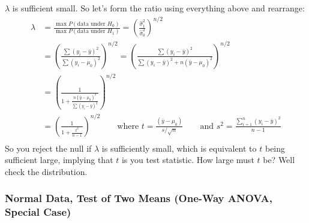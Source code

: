 \documentclass[a4paper,12pt]{scrartcl}
\begin{document}
$\lambda$ is sufficient small. So let's form the ratio using 
everything above and rearrange:
\begin{align*}
   \lambda &= \frac{\max P(\text{data under $H_0$})}{
      \max P(\text{data under $H_1$})} = \left(
      \frac{\hat{\sigma}_1^2}{\hat{\sigma}_0^2}\right)^{n/2}\\
   &= \left( \frac{\sum (y_i - \bar{y})^2}{\sum (y_i - \mu_0)^2}
      \right)^{n/2}
   = \left( \frac{\sum (y_i - \bar{y})^2}{\sum (y_i - \bar{y})^2 +
   n(\bar{y} - \mu_0)^2}
      \right)^{n/2}\\
   &= \left( \frac{1}{1 + \frac{n(\bar{y} - \mu_0)^2}{
      \sum (y_i - \bar{y})^2 }}
      \right)^{n/2}\\
   &= \left( \frac{1}{1 + \frac{t^2}{n-1}}
   \right)^{n/2} \qquad \text{where } 
   t = \frac{(\bar{y}-\mu_0)}{s/\sqrt{n}}\qquad 
   \text{and } s^2 = \frac{\sum^n_{i=1} (y_i - \bar{y})^2}{n-1} \\
\end{align*}
So you reject the null if $\lambda$ is sufficiently small, which
is equivalent to $t$ being sufficient large, implying that $t$ is you
test statistic. How large must $t$ be? Well check the distribution.

\newpage
\subsubsection{Normal Data, Test of Two Means (One-Way ANOVA, Special
   Case)}
\end{document}
